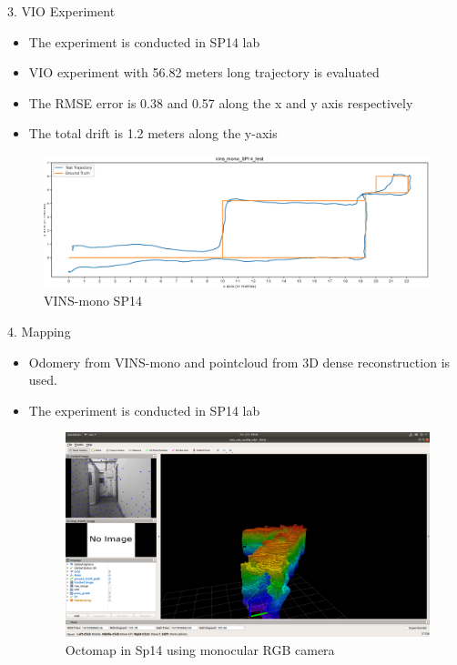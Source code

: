 \documentclass[10pt]{beamer}
\begin{document}
\begin{frame}{}
\begin{description}
    \item[3. VIO Experiment]
\end{description}
        \begin{itemize}
            \item The experiment is conducted in SP14 lab
            \item VIO experiment with 56.82 meters long trajectory is evaluated   
            \item The RMSE error is 0.38 and 0.57 along the x and y axis respectively
            \item The total drift is 1.2 meters along the y-axis
        \end{itemize}{}
            \begin{figure}[h!]
			\centering
			\includegraphics[scale=0.32]{vins_mono_SP14_test.eps} 
			\caption{VINS-mono SP14}
			\label{Fig:vins_mono}
		\end{figure}
\end{frame}

\begin{frame}{}
    \begin{description}
        \item[4. Mapping]
    \end{description}
    \begin{itemize}
        \item Odomery from VINS-mono and pointcloud from 3D dense reconstruction is used.
        \item The experiment is conducted in SP14 lab
        \begin{figure}[!ht]
            \centering
            \includegraphics[scale=0.11]{Octomap_Sp14-2.png}
            \caption{Octomap in Sp14 using monocular RGB camera}
            \label{fig:octomap_sp14}
        \end{figure}
    \end{itemize}
\end{frame}
\end{document}
